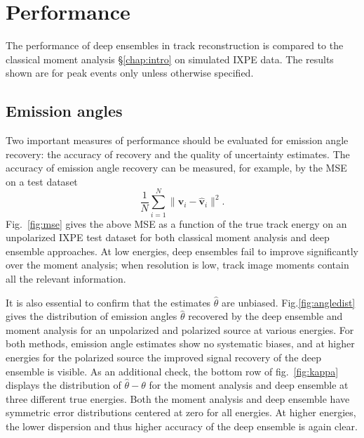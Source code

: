 \section{Performance}
\label{sec:perform}
The performance of deep ensembles in track reconstruction is compared to the classical moment analysis \S\ref{chap:intro} on simulated IXPE data. The results shown are for peak events only unless otherwise specified.


\subsection{Emission angles}  Two important measures of performance should be evaluated for emission angle recovery: the accuracy of recovery and the quality of uncertainty estimates. The accuracy of emission angle recovery can be measured, for example, by the MSE on a test dataset
\begin{equation}
\label{eqn:vmse}
    \frac{1}{N}\sum^N_{i=1} \|\mathbf{v}_i - \mathbf{\hat{v}}_i\|^2.
\end{equation}
Fig.~\ref{fig:mse} gives the above MSE as a function of the true track energy on an unpolarized IXPE test dataset for both classical moment analysis and deep ensemble approaches. At low energies, deep ensembles fail to improve significantly over the moment analysis; when resolution is low, track image moments contain all the relevant information. 

It is also essential to confirm that the estimates $\hat{\theta}$ are unbiased.
Fig.\ref{fig:angledist} gives the distribution of emission angles $\hat{\theta}$ recovered by the deep ensemble and moment analysis for an unpolarized and polarized source at various energies. For both methods, emission angle estimates show no systematic biases, and at higher energies for the polarized source the improved signal recovery of the deep ensemble is visible. 
As an additional check, the bottom row of fig.~\ref{fig:kappa} displays the distribution of $\hat{\theta} - \theta$ for the moment analysis and deep ensemble at three different true energies. Both the moment analysis and deep ensemble have symmetric error distributions centered at zero for all energies. At higher energies, the lower dispersion and thus higher accuracy of the deep ensemble is again clear.

